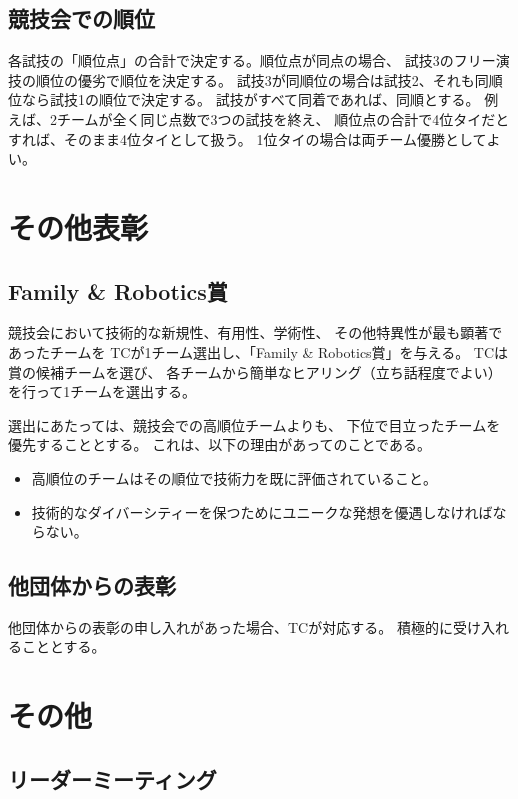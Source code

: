 \documentclass[a4j]{jarticle}
\begin{document}
\subsection{競技会での順位}

各試技の「順位点」の合計で決定する。順位点が同点の場合、
試技3のフリー演技の順位の優劣で順位を決定する。
試技3が同順位の場合は試技2、それも同順位なら試技1の順位で決定する。
試技がすべて同着であれば、同順とする。
例えば、2チームが全く同じ点数で3つの試技を終え、
順位点の合計で4位タイだとすれば、そのまま4位タイとして扱う。
1位タイの場合は両チーム優勝としてよい。


\section{その他表彰}

\subsection{Family \& Robotics賞}

競技会において技術的な新規性、有用性、学術性、
その他特異性が最も顕著であったチームを
TCが1チーム選出し、「Family \& Robotics賞」を与える。
TCは賞の候補チームを選び、
各チームから簡単なヒアリング（立ち話程度でよい）
を行って1チームを選出する。

選出にあたっては、競技会での高順位チームよりも、
下位で目立ったチームを優先することとする。
これは、以下の理由があってのことである。
\begin{itemize}
	\item 高順位のチームはその順位で技術力を既に評価されていること。
	\item 技術的なダイバーシティーを保つためにユニークな発想を優遇しなければならない。
\end{itemize}

\subsection{他団体からの表彰}

他団体からの表彰の申し入れがあった場合、TCが対応する。
積極的に受け入れることとする。

\section{その他}

\subsection{リーダーミーティング}
\end{document}

